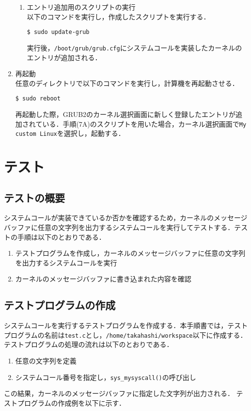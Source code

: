 \documentclass[12pt]{jsarticle}
\begin{document}
\begin{enumerate}
\begin{enumerate}
\item エントリ追加用のスクリプトの実行\\
  以下のコマンドを実行し，作成したスクリプトを実行する．
\begin{verbatim}
$ sudo update-grub
\end{verbatim}
実行後，\verb|/boot/grub/grub.cfg|にシステムコールを実装したカーネルのエントリが追加される．
  \end{enumerate}
  
\item 再起動 \\
  任意のディレクトリで以下のコマンドを実行し，計算機を再起動させる．
\begin{verbatim}
$ sudo reboot
\end{verbatim}
再起動した際，GRUB2のカーネル選択画面に新しく登録したエントリが追加されている．手順(7A)のスクリプトを用いた場合，カーネル選択画面で\verb|My custom Linux|を選択し，起動する．

\end{enumerate}

\newpage
\section{テスト}
\label{sec:test}
\subsection{テストの概要}
システムコールが実装できているか否かを確認するため，カーネルのメッセージバッファに任意の文字列を出力するシステムコールを実行してテストする．テストの手順は以下のとおりである．

\begin{enumerate}
\item テストプログラムを作成し，カーネルのメッセージバッファに任意の文字列を出力するシステムコールを実行
\item カーネルのメッセージバッファに書き込まれた内容を確認
\end{enumerate}

\subsection{テストプログラムの作成}
システムコールを実行するテストプログラムを作成する．本手順書では，テストプログラムの名前は\verb|test.c|とし，\verb|/home/takahashi/workspace|以下に作成する．テストプログラムの処理の流れは以下のとおりである．

\begin{enumerate}
\item 任意の文字列を定義
\item システムコール番号を指定し，\verb|sys_mysyscall()|の呼び出し
\end{enumerate}
この結果，カーネルのメッセージバッファに指定した文字列が出力される．
テストプログラムの作成例を以下に示す．
\end{document}
